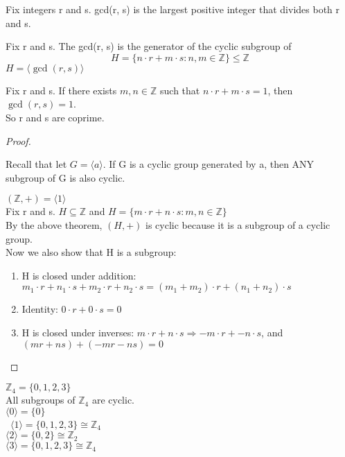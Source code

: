 \begin{definition}
    Fix integers r and s. gcd(r, s) is the largest positive integer that divides both r and s.\\ 
\end{definition}

\begin{definition}
    Fix r and s. The gcd(r, s) is the generator of the cyclic subgroup of \[H = \{n\cdot r + m \cdot s : n, m \in \mathbb{Z}\} \leq \mathbb{Z}\]
    $H = \langle \gcd(r, s) \rangle$\\
\end{definition}

\begin{corollary}
    Fix r and s. If there exists $m, n \in \mathbb{Z}$ such that $n \cdot r + m \cdot s = 1$, then $\gcd(r, s) = 1$.\\
    So r and s are coprime.\\
\end{corollary}
\begin{proof}
    \vphantom{}\\
    \begin{prev}
        Recall that let $G = \langle a \rangle$. If G is a cyclic group generated by a, then ANY subgroup of G is also cyclic.
    \end{prev}
    \noindent$(\mathbb{Z}, +) = \langle 1 \rangle$\\
    Fix r and s. $H \subseteq \mathbb{Z}$ and $H = \{m \cdot r + n \cdot s : m, n \in \mathbb{Z}\}$\\
    By the above theorem, $(H, +)$ is cyclic because it is a subgroup of a cyclic group.\\
    Now we also show that H is a subgroup:
    \begin{enumerate}
        \item H is closed under addition: $m_1 \cdot r + n_1 \cdot s + m_2 \cdot r + n_2 \cdot s = (m_1 + m_2) \cdot r + (n_1 + n_2) \cdot s$
        \item Identity: $0 \cdot r + 0 \cdot s = 0$
        \item H is closed under inverses: $m \cdot r + n \cdot s \Rightarrow -m \cdot r + -n \cdot s$, and $(mr+ns) + (-mr-ns) = 0$
    \end{enumerate}
\end{proof}

\begin{eg}
    $\mathbb{Z}_4 = \{0, 1, 2, 3\}$\\
    All subgroups of $\mathbb{Z}_4$ are cyclic.\\
    $\langle 0 \rangle = \{0\}$\\\
    $\langle 1 \rangle = \{0, 1, 2, 3\} \cong \mathbb{Z}_4$\\
    $\langle 2 \rangle = \{0, 2\} \cong \mathbb{Z}_2$\\
    $\langle 3 \rangle = \{0, 1, 2, 3\} \cong \mathbb{Z}_4$\\
\end{eg}

